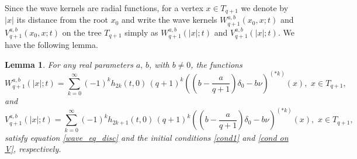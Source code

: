 \documentclass[12pt]{amsart}
\numberwithin{equation}{section}
\newtheorem{lemma}[theorem]{Lemma}
\theoremstyle{boldremark}
\begin{document}
Since the wave kernels are radial functions, for a vertex $x\in T_{q+1}$ we denote by $|x|$ its distance from the root $x_0$ and write the wave kernels $W_{q+1}^{a,b}(x_0,x;t)$ and $V_{q+1}^{a,b}(x_0,x;t)$ on the tree $T_{q+1}$ simply as $W_{q+1}^{a,b}(|x|;t)$  and $V_{q+1}^{a,b}(|x|;t)$. We have the following lemma.
\begin{lemma} \label{lem: kernels on tree}
For any real parameters $a,\, b$, with $b\neq 0$, the functions
\begin{equation}\label{wave w as conv}
W_{q+1}^{a,b}(|x|;t) = \sum_{k=0}^{\infty} (-1)^k h_{2k}(t,0)\,(q+1)^k \left(\left(b-\frac{a}{q+1}\right) \delta_0 -b\nu \right)^{(*k)}(x),\,\, x\in T_{q+1},
\end{equation}
and
\begin{equation} \label{wave V as conv}
V_{q+1}^{a,b}(|x|;t) = \sum_{k=0}^{\infty} (-1)^k h_{2k+1}(t,0)\,(q+1)^k \left(\left(b-\frac{a}{q+1}\right) \delta_0 -b\nu \right)^{(*k)}(x),\,\, x\in T_{q+1},
\end{equation}
satisfy equation \eqref{wave_eq_disc} and the initial conditions \eqref{cond1} and \eqref{cond on V}, respectively.
\end{lemma}
\end{document}
